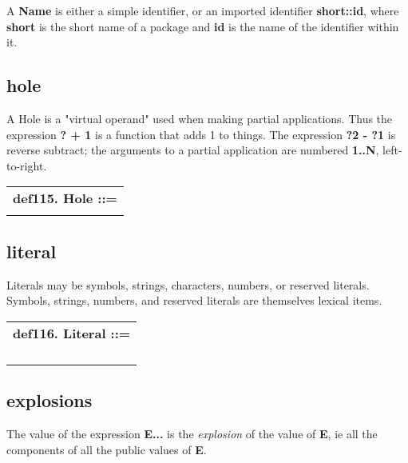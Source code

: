 \documentclass{report}
\begin{document}
A {\bf Name} is either a simple identifier, or an imported identifier
{\bf short::id}, where {\bf short} is the short name of a package and {\bf id} is
the name of the identifier within it.\subsection{hole}


A Hole is a "virtual operand" used when making partial applications.
Thus the expression {\bf ? + 1} is a function that adds 1 to things. The
expression {\bf ?2 - ?1} is reverse subtract; the arguments to a partial
application are numbered {\bf 1..N}, left-to-right.

\begin{tabular}{l}
{\bf def115. Hole ::= }\\ 
\hspace*{3mm}{\tt "?" {[}(Integer){]}} \\ 
\end{tabular}

\subsection{literal}


Literals may be symbols, strings, characters, numbers, or reserved
literals. Symbols, strings, numbers, and reserved literals are
themselves lexical items.

\begin{tabular}{l}
{\bf def116. Literal ::= }\\ 
\hspace*{3mm}{\tt StringLiteral} \\ 
\hspace*{3mm}{\tt  $\mid$ NumberLiteral} \\ 
\hspace*{3mm}{\tt  $\mid$ ReservedLiteral} \\ 
\hspace*{3mm}{\tt  $\mid$ CharacterLiteral} \\ 
\end{tabular}

\subsection{explosions}


The value of the expression {\bf E...} is the {\em explosion} of the value of {\bf E}, ie
all the components of all the public values of {\bf E}.
\end{document}
